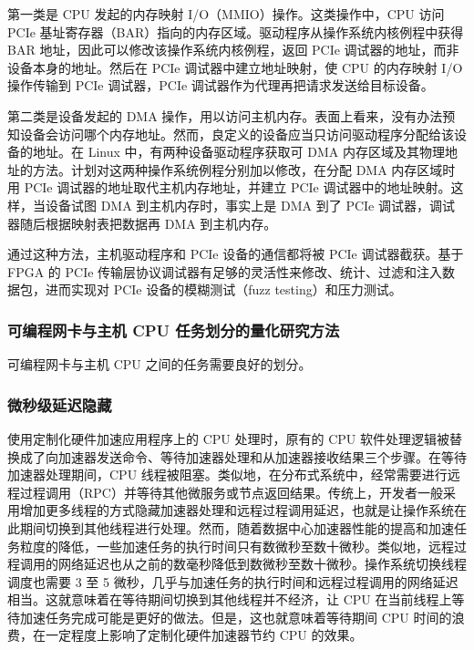 第一类是 CPU 发起的内存映射 I/O（MMIO）操作。这类操作中，CPU 访问 PCIe 基址寄存器（BAR）指向的内存区域。驱动程序从操作系统内核例程中获得 BAR 地址，因此可以修改该操作系统内核例程，返回 PCIe 调试器的地址，而非设备本身的地址。然后在 PCIe 调试器中建立地址映射，使 CPU 的内存映射 I/O 操作传输到 PCIe 调试器，PCIe 调试器作为代理再把请求发送给目标设备。

第二类是设备发起的 DMA 操作，用以访问主机内存。表面上看来，没有办法预知设备会访问哪个内存地址。然而，良定义的设备应当只访问驱动程序分配给该设备的地址。在 Linux 中，有两种设备驱动程序获取可 DMA 内存区域及其物理地址的方法。计划对这两种操作系统例程分别加以修改，在分配 DMA 内存区域时用 PCIe 调试器的地址取代主机内存地址，并建立 PCIe 调试器中的地址映射。这样，当设备试图 DMA 到主机内存时，事实上是 DMA 到了 PCIe 调试器，调试器随后根据映射表把数据再 DMA 到主机内存。

通过这种方法，主机驱动程序和 PCIe 设备的通信都将被 PCIe 调试器截获。基于 FPGA 的 PCIe 传输层协议调试器有足够的灵活性来修改、统计、过滤和注入数据包，进而实现对 PCIe 设备的模糊测试（fuzz testing）和压力测试。


\subsubsection{可编程网卡与主机 CPU 任务划分的量化研究方法}
\label{future:work-split}

可编程网卡与主机 CPU 之间的任务需要良好的划分。


\subsubsection{微秒级延迟隐藏}
\label{future:latency-hiding}

使用定制化硬件加速应用程序上的 CPU 处理时，原有的 CPU 软件处理逻辑被替换成了向加速器发送命令、等待加速器处理和从加速器接收结果三个步骤。在等待加速器处理期间，CPU 线程被阻塞。类似地，在分布式系统中，经常需要进行远程过程调用（RPC）并等待其他微服务或节点返回结果。传统上，开发者一般采用增加更多线程的方式隐藏加速器处理和远程过程调用延迟，也就是让操作系统在此期间切换到其他线程进行处理。然而，随着数据中心加速器性能的提高和加速任务粒度的降低，一些加速任务的执行时间只有数微秒至数十微秒。类似地，远程过程调用的网络延迟也从之前的数毫秒降低到数微秒至数十微秒。操作系统切换线程调度也需要 3 至 5 微秒，几乎与加速任务的执行时间和远程过程调用的网络延迟相当。这就意味着在等待期间切换到其他线程并不经济，让 CPU 在当前线程上等待加速任务完成可能是更好的做法。但是，这也就意味着等待期间 CPU 时间的浪费，在一定程度上影响了定制化硬件加速器节约 CPU 的效果。

